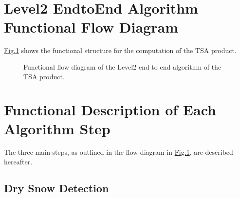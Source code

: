 \documentclass[letterpaper,10pt,english]{jupyterBook}
\let\sphinxpxdimen\pdfpxdimen\else\newdimen\sphinxpxdimen
\begin{document}
\section{Level\sphinxhyphen{}2 End\sphinxhyphen{}to\sphinxhyphen{}End Algorithm Functional Flow Diagram}
\label{\detokenize{book/baseline_algorithm_definition:level-2-end-to-end-algorithm-functional-flow-diagram}}
\sphinxAtStartPar
\hyperref[\detokenize{book/baseline_algorithm_definition:flow-diagram}]{Fig.\@ \ref{\detokenize{book/baseline_algorithm_definition:flow-diagram}}} shows the functional structure for the computation of the TSA product.

\begin{figure}[htbp]
\centering
\capstart

\noindent\sphinxincludegraphics[width=450\sphinxpxdimen]{{L2-algorithm}.png}
\caption{Functional flow diagram of the Level\sphinxhyphen{}2 end to end algorithm of the TSA product.}\label{\detokenize{book/baseline_algorithm_definition:flow-diagram}}\end{figure}


\section{Functional Description of Each Algorithm Step}
\label{\detokenize{book/baseline_algorithm_definition:functional-description-of-each-algorithm-step}}
\sphinxAtStartPar
The three main steps, as outlined in the flow diagram in \hyperref[\detokenize{book/baseline_algorithm_definition:flow-diagram}]{Fig.\@ \ref{\detokenize{book/baseline_algorithm_definition:flow-diagram}}}, are described hereafter.


\subsection{Dry Snow Detection}
\label{\detokenize{book/baseline_algorithm_definition:dry-snow-detection}}
\end{document}
